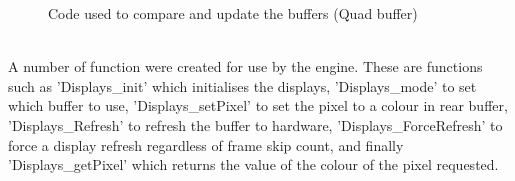 \documentclass[a4paper,12pt]{article}
\begin{document}
\begin{flushleft}
\begin{figure}[H]
	\centering
	
		\caption{Code used to compare and update the buffers (Quad buffer)}
\end{figure}
\- \\
A number of function were created for use by the engine. These are functions such as 'Displays\_init' which initialises the displays, 'Displays\_mode' to set which buffer to use, 'Displays\_setPixel' to set the pixel to a colour in rear buffer, 'Displays\_Refresh' to refresh the buffer to hardware, 'Displays\_ForceRefresh' to force a display refresh regardless of frame skip count, and finally 'Displays\_getPixel' which returns the value of the colour of the pixel requested.
\end{flushleft}
\newpage
\end{document}
